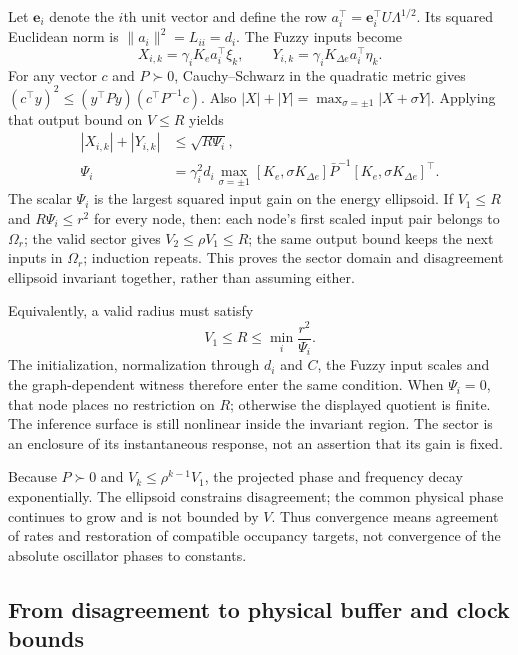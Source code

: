 Let $\mathbf e_i$ denote the $i$th unit vector and define the row
$a_i^\top=\mathbf e_i^\top U\Lambda^{1/2}$. Its squared Euclidean norm
is $\|a_i\|^2=L_{ii}=d_i$. The Fuzzy inputs become
\begin{equation}
 X_{i,k}=\gamma_iK_ea_i^\top\xi_k,\qquad
 Y_{i,k}=\gamma_iK_{\Delta e}a_i^\top\eta_k.
 \label{eq:btd_d_linear_outputs}
\end{equation}
For any vector $c$ and $P\succ0$, Cauchy--Schwarz in the quadratic
metric gives $(c^\top y)^2\le(y^\top P y)(c^\top P^{-1}c)$.
Also $|X|+|Y|=\max_{\sigma=\pm1}|X+\sigma Y|$. Applying that output
bound on $V\le R$ yields
\begin{align}
 |X_{i,k}|+|Y_{i,k}|&\le\sqrt{R\Psi_i},\nonumber\\
 \Psi_i&=\gamma_i^2d_i\max_{\sigma=\pm1}
 [K_e,\sigma K_{\Delta e}]\bar P^{-1}
 [K_e,\sigma K_{\Delta e}]^\top.
 \label{eq:btd_input_factor}
\end{align}
The scalar $\Psi_i$ is the largest squared input gain on the energy
ellipsoid. If $V_1\le R$ and $R\Psi_i\le r^2$ for every node, then:
each node's first scaled input pair belongs to $\Omega_r$; the valid sector gives
$V_2\le\rho V_1\le R$; the same output bound keeps the next inputs in
$\Omega_r$; induction repeats. This proves the sector domain and
disagreement ellipsoid invariant together, rather than assuming either.

Equivalently, a valid radius must satisfy
\begin{equation}
 V_1\le R\le\min_i\frac{r^2}{\Psi_i}.
 \label{eq:btd_sector_radius_condition}
\end{equation}
The initialization, normalization through $d_i$ and $C$, the Fuzzy input
scales and the graph-dependent witness therefore enter the same
condition. When $\Psi_i=0$, that node places no restriction on $R$;
otherwise the displayed quotient is finite. The inference surface is
still nonlinear inside the invariant region. The sector is an enclosure
of its instantaneous response, not an assertion that its gain is fixed.

Because $P\succ0$ and $V_k\le\rho^{k-1}V_1$, the projected phase and
frequency decay exponentially. The ellipsoid constrains disagreement;
the common physical phase continues to grow and is not bounded by $V$.
Thus convergence means agreement of rates and restoration of compatible
occupancy targets, not convergence of the absolute oscillator phases to constants.

\subsection{From disagreement to physical buffer and clock bounds}

